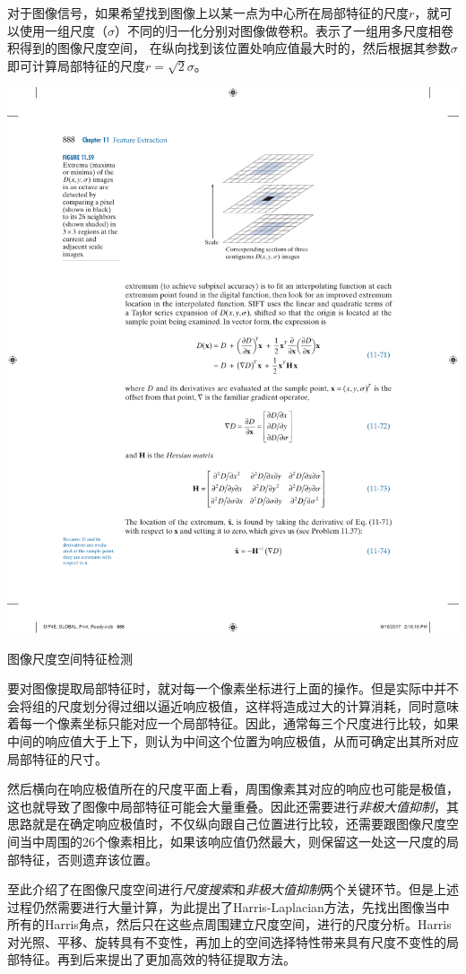对于图像信号，如果希望找到图像上以某一点为中心所在局部特征的尺度$r$，就可以使用一组尺度（$\sigma$）不同的归一化\lpl 分别对图像做卷积。表示了一组用多尺度\lpl 相卷积得到的图像尺度空间，%
在纵向找到该位置处响应值最大时的\lpl，然后根据其参数$\sigma$即可计算局部特征的尺度$r = \sqrt{2}\sigma$。%
\begin{marginfigure}
	\centering
	\includegraphics[width=\textwidth]{fig/Scale-space blob detector.pdf}
	\caption{图像尺度空间特征检测}
	\label{fig:Scale-space blob detector}
\end{marginfigure}


要对图像提取局部特征时，就对每一个像素坐标进行上面的操作。但是实际中并不会将\lpl 组的尺度划分得过细以逼近响应极值，这样将造成过大的计算消耗，同时意味着每一个像素坐标只能对应一个局部特征。因此，通常每三个\lpl 尺度进行比较，如果中间的响应值大于上下，则认为中间这个位置为响应极值，从而可确定出其所对应局部特征的尺寸。

然后横向在响应极值所在的尺度平面上看，周围像素其对应的响应也可能是极值，这也就导致了图像中局部特征可能会大量重叠。因此还需要进行\emph{非极大值抑制}，其思路就是在确定响应极值时，不仅纵向跟自己位置进行比较，还需要跟图像尺度空间当中周围的26个像素相比，如果该响应值仍然最大，则保留这一处这一尺度的局部特征，否则遗弃该位置。

至此介绍了在图像尺度空间进行\emph{尺度搜索}和\emph{非极大值抑制}两个关键环节。但是上述过程仍然需要进行大量计算，为此\cite{mikolajczyk2001indexing}提出了Harris-Laplacian方法，先找出图像当中所有的Harris角点，然后只在这些点周围建立尺度空间，进行\lpl 的尺度分析。Harris对光照、平移、旋转具有不变性，再加上\lpl 的空间选择特性带来具有尺度不变性的局部特征。再到后来\cite{lowe2004distinctive}提出了更加高效的\sift 特征提取方法。
